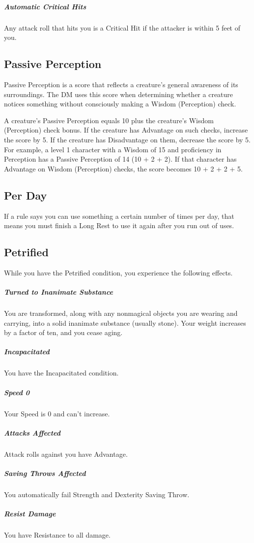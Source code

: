 \documentclass[10pt,a4paper,twoside,bg=print,twocolumn,openany,nodeprecatedcode]{dndarticle}
\begin{document}
\subparagraph{Automatic Critical Hits}
Any attack roll that hits you is a Critical Hit if the attacker is within 5 feet of you.

\subsection{Passive Perception}
Passive Perception is a score that reflects a creature's general awareness of its surroundings. The DM uses this score when determining whether a creature notices something without consciously making a Wisdom (Perception) check.

A creature's Passive Perception equals 10 plus the creature's Wisdom (Perception) check bonus. If the creature has Advantage on such checks, increase the score by 5. If the creature has Disadvantage on them, decrease the score by 5. For example, a level 1 character with a Wisdom of 15 and proficiency in Perception has a Passive Perception of 14 (10 + 2 + 2). If that character has Advantage on Wisdom (Perception) checks, the score becomes 10 + 2 + 2 + 5.

\subsection{Per Day}
If a rule says you can use something a certain number of times per day, that means you must finish a Long Rest to use it again after you run out of uses.

\subsection{Petrified}
While you have the Petrified condition, you experience the following effects.

\subparagraph{Turned to Inanimate Substance}
You are transformed, along with any nonmagical objects you are wearing and carrying, into a solid inanimate substance (usually stone). Your weight increases by a factor of ten, and you cease aging.

\subparagraph{Incapacitated}
You have the Incapacitated condition.

\subparagraph{Speed 0}
Your Speed is 0 and can't increase.

\subparagraph{Attacks Affected}
Attack rolls against you have Advantage.

\subparagraph{Saving Throws Affected}
You automatically fail Strength and Dexterity Saving Throw.

\subparagraph{Resist Damage}
You have Resistance to all damage.
\end{document}
